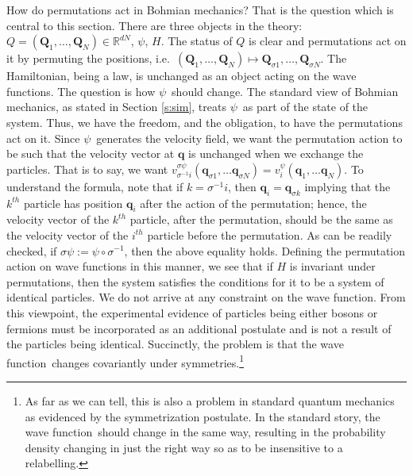 \documentclass[11pt]{article}
\theoremstyle{remark}
\begin{document}
How do permutations act in Bohmian mechanics? That is the question which is central
to this section. There are three objects in the theory: $Q = 
(\boldsymbol Q_1, \ldots, \boldsymbol Q_N) \in \ensuremath{\mathbb{R}^{\ensuremath{d} N}}$, \ensuremath{\psi},
$H$. The status of $Q$ is clear and permutations act on it by
permuting the positions, i.e.\ $( \boldsymbol Q_1, \ldots, \boldsymbol
Q_N) \mapsto \boldsymbol Q_{\sigma 1}, \ldots, \boldsymbol Q_{\sigma
N}$. The Hamiltonian, being a law, is unchanged as an object acting on
the wave functions. The question is how \ensuremath{\psi}\ should change. 
The standard view of Bohmian mechanics, as stated in Section {\ref{s:sim}}, treats
\ensuremath{\psi}\ as part of the state of the system. Thus, we have the freedom,
and the obligation, to have the permutations act on it. Since  \ensuremath{\psi}\
generates the velocity field, we want the permutation action to be
such that the velocity vector at $\ensuremath{\boldsymbol{q}}$ is unchanged when we exchange
the particles. That is to say, we want 
$ v^{\sigma \ensuremath{\psi}}_{\sigma^{-1} i}  (\ensuremath{\boldsymbol{q}}_{\sigma 1}, \ldots
\ensuremath{\boldsymbol{q}}_{\sigma N})  
= v^{\ensuremath{\psi}}_i (\ensuremath{\boldsymbol{q}}_1, \ldots \ensuremath{\boldsymbol{q}}_N). 
$ To understand the formula, 
note that if $k = \sigma^{-1} i$, then 
$\ensuremath{\boldsymbol{q}}_i = \ensuremath{\boldsymbol{q}}_{\sigma k} $ implying that the $\ensuremath{{k}^{th}}$
particle has position $\ensuremath{\boldsymbol{q}}_i$ after the action of the
permutation; hence, the velocity vector of the $\ensuremath{{k}^{th}}$ particle, after the
permutation, should be the same as the velocity vector of the
$\ensuremath{{i}^{th}}$ particle before the permutation. 
As can be readily checked, if $\sigma \ensuremath{\psi} \ensuremath{:=} \ensuremath{\psi} \circ
\sigma^{-1}$, then the above equality holds. Defining the permutation
action on wave functions in this manner, we see that if $H$ is invariant under
permutations, then the system satisfies the conditions for it to be a
system of identical particles. We do not arrive at any constraint on
the wave function. From this viewpoint, the experimental evidence of particles
being either bosons or fermions must be incorporated as an additional
postulate and is not a result of the particles being identical. 
Succinctly, the problem is that the
wave function\ changes covariantly under symmetries.\footnote{As far as we can
tell, this is also a problem in standard quantum mechanics as
evidenced by the symmetrization postulate. In the standard story,
the wave function\ should change in the same way, resulting in the
probability density changing in just the right way so as to be
insensitive to a relabelling.} 
\end{document}
